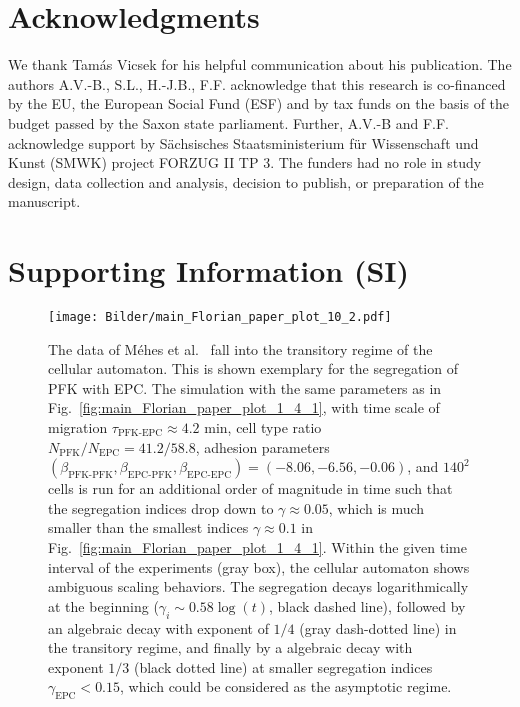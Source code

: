 \documentclass[10pt,letterpaper]{article}
\newcommand{\figref}[1]{Fig.~\ref{fig:#1}}
\begin{document}
\section*{Acknowledgments}
We thank Tam\'{a}s Vicsek for his helpful communication about his
publication. The authors A.V.-B., S.L., H.-J.B., F.F. acknowledge that
this research is co-financed by the EU, the European Social Fund (ESF) and
by tax funds on the basis of the budget passed by the Saxon state parliament.
Further, A.V.-B and F.F. acknowledge support by Sächsisches
Staatsministerium für Wissenschaft und Kunst (SMWK) project FORZUG II TP 3.
The funders had no role in study design, data collection and analysis, decision
to publish, or preparation of the manuscript.

\newpage

\renewcommand{\theequation}{S\arabic{equation}}
\setcounter{section}{1} %
\setcounter{subsection}{0} %
\renewcommand{\thesubsection}{\Alph{subsection}}
\setcounter{equation}{0}  %
\renewcommand{\thefigure}{\Alph{figure}}
\setcounter{figure}{0}  %
\renewcommand{\thetable}{\Alph{table}}
\setcounter{table}{0}  %

\section*{Supporting Information (SI)}

\begin{figure}[ht!]
 \centering
 \texttt{[image: Bilder/main\_Florian\_paper\_plot\_10\_2.pdf]}
 \caption{The data of Méhes et al.~\cite{MehMonNemVic2012} fall into
   the transitory regime of the cellular automaton. This is shown
   exemplary for the segregation of PFK with EPC. The simulation with
   the same parameters as in \figref{main_Florian_paper_plot_1_4_1},
   with time scale of migration $\tau_\text{PFK-EPC}\approx 4.2$ min,
   cell type ratio $N_\text{PFK}/N_\text{EPC}=41.2/58.8$, adhesion
   parameters
   $(\beta_\text{PFK-PFK},\beta_\text{EPC-PFK},\beta_\text{EPC-EPC})=(-8.06,-6.56,-0.06)$,
   and $140^2$ cells is run for an additional order of magnitude in
   time such that the segregation indices drop down to
   $\gamma\approx0.05$, which is much smaller than the smallest
   indices $\gamma\approx0.1$ in
   \figref{main_Florian_paper_plot_1_4_1}. Within the given time
   interval of the experiments (gray box), the cellular automaton
   shows ambiguous scaling behaviors. The segregation decays
   logarithmically at the beginning ($\gamma_i \sim 0.58 \log(t)$,
   black dashed line), followed by an algebraic decay with exponent of
   $1/4$ (gray dash-dotted line) in the transitory regime, and finally
   by a algebraic decay with exponent $1/3$ (black dotted line) at
   smaller segregation indices $\gamma_{\text{EPC}}<0.15$, which could
   be considered as the asymptotic regime.}
 \label{fig:main_Florian_paper_plot_10_2}
\end{figure}
\end{document}
